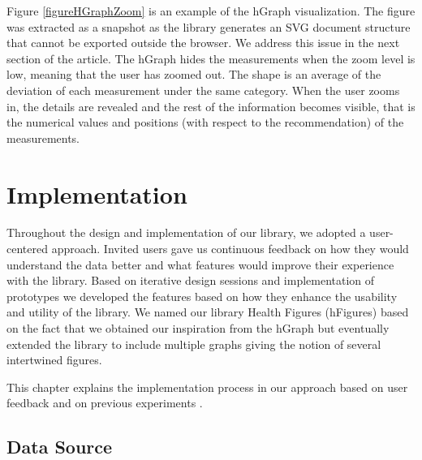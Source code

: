 \documentclass[twocolumn]{bmcart}%
\begin{document}
Figure \ref{figureHGraphZoom} is an example of the hGraph visualization. The figure was extracted as a snapshot as the library generates an SVG document structure that cannot be exported outside the browser. We address this issue in the next section of the article. The hGraph hides the measurements when the zoom level is low, meaning that the user has zoomed out. The shape is an average of the deviation of each measurement under the same category. When the user zooms in, the details are revealed and the rest of the information becomes visible, that is the numerical values and positions (with respect to the recommendation) of the measurements.

\section*{Implementation} 

Throughout the design and implementation of our library, we adopted a user-centered approach. Invited users gave us continuous feedback on how they would understand the data better and what features would improve their experience with the library. Based on iterative design sessions and implementation of prototypes we developed the features based on how they enhance the usability and utility of the library. We named our library Health Figures (hFigures) based on the fact that we obtained our inspiration from the hGraph but eventually extended the library to include multiple graphs giving the notion of several intertwined figures.

This chapter explains the implementation process in our approach based on user feedback and on previous experiments \cite{EMBCLedNiem}. 



\subsection*{Data Source}
\end{document}
